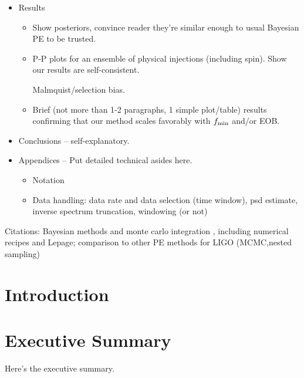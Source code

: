 \documentclass[twocolumn,prd,nofootinbib]{revtex4}
\begin{document}
\begin{widetext}
\begin{itemize}
\item Results
	\begin{itemize}
	\item Show posteriors, convince reader they're similar enough to usual Bayesian PE to be trusted.
	\item P-P plots for an ensemble of physical injections (including spin). Show our results are self-consistent.

          Malmquist/selection bias.  
	\item Brief (not more than 1-2 paragraphs, 1 simple plot/table) results confirming 
		that our method scales favorably with $f_{\rm min}$ and/or EOB. 
	\end{itemize}

\item Conclusions -- self-explanatory.

\item Appendices -- Put detailed technical asides here.

  \begin{itemize}
    \item Notation
    \item Data handling: data rate and data selection (time window), psd estimate, inverse spectrum truncation, windowing (or not)
  \end{itemize}

\end{itemize}

Citations: Bayesian methods and monte carlo integration \cite{2011RvMP...83..943V}, including numerical recipes and Lepage; comparison
to other PE methods for LIGO
(MCMC,nested sampling) \cite{LIGO-CBC-S6-PE,2011PhRvD..83h2002D,2011PhRvD..84f2003C,gr-extensions-tests-Europeans2011,gwastro-mergers-PE-Aylott-LIGOATest,2011ApJ...739...99N,2012PhRvD..85j4045V,gw-astro-PE-Raymond,gw-astro-PE-lalinference-v1}

\tableofcontents

\end{widetext}

\section{Introduction}

\section{Executive Summary}

Here's the executive summary.
\end{document}
